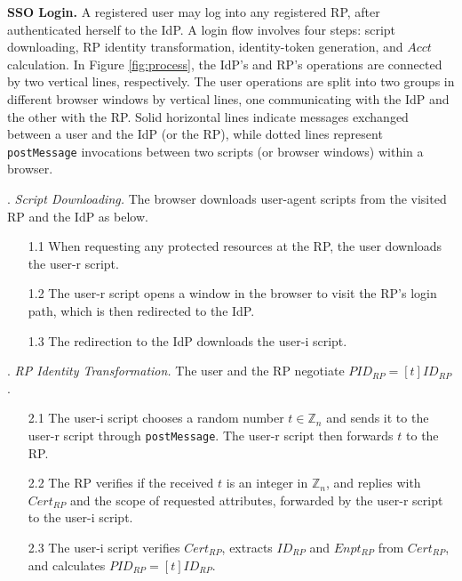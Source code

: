 \vspace{1mm}
\noindent\textbf{SSO Login.} 
A registered user may log into any registered RP,
    after authenticated herself to the IdP.
A login flow %
involves four steps: script downloading, RP identity transformation, identity-token generation, and $Acct$ calculation. In Figure \ref{fig:process}, the IdP's and RP's operations are connected by two vertical lines, respectively. The user operations are split into two groups in different browser windows by vertical lines, one communicating with the IdP and the other with the RP. Solid horizontal lines indicate messages exchanged between a user and the IdP (or the RP), while dotted lines represent \verb+postMessage+ invocations between two scripts (or browser windows) within a browser.


\vspace{1mm}
. {\em Script Downloading.}
The browser downloads user-agent scripts from the visited RP and the IdP as below.
\vspace{-\topsep}
\begin{itemize}
\setlength{\topsep}{0pt}
\setlength{\partopsep}{0pt}
\setlength{\itemsep}{0pt}
\setlength{\parsep}{0pt}
\setlength{\parskip}{0pt}
\item[1.1]
When requesting any protected resources at the RP, the user downloads the user-r script.
\item[1.2]
The user-r script opens a window in the browser to visit the RP's login path, which is then redirected to the IdP.
\item[1.3]
The redirection to the IdP downloads the user-i script.
\end{itemize}


. {\em RP Identity Transformation.}
The user and the RP negotiate $PID_{RP} = [t]{ID_{RP}}$.
\vspace{-\topsep}
\begin{itemize}
\setlength{\topsep}{0pt}
\setlength{\partopsep}{0pt}
\setlength{\itemsep}{0pt}
\setlength{\parsep}{0pt}
\setlength{\parskip}{0pt}
\item[2.1] The user-i script chooses a random number $t \in \mathbb{Z}_n$ and sends it to the user-r script through \verb+postMessage+. The user-r script then forwards $t$ to the RP.
\item[2.2] The RP verifies if the received $t$ is an integer in $\mathbb{Z}_n$, and
replies with $Cert_{RP}$ and the scope of requested attributes, forwarded by the user-r script to the user-i script.  %
\item[2.3] The user-i script verifies $Cert_{RP}$, extracts $ID_{RP}$ and $Enpt_{RP}$ from $Cert_{RP}$, and calculates $PID_{RP}=[t]{ID_{RP}}$.

\end{itemize}


